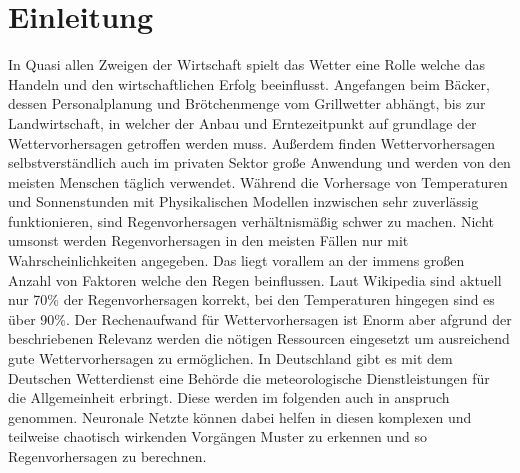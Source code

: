 \section{Einleitung}
In Quasi allen Zweigen der Wirtschaft spielt das Wetter eine Rolle welche das Handeln und den wirtschaftlichen Erfolg beeinflusst.
Angefangen beim Bäcker, dessen Personalplanung und Brötchenmenge vom Grillwetter abhängt, 
bis zur Landwirtschaft, in welcher der Anbau und Erntezeitpunkt auf grundlage der Wettervorhersagen getroffen werden muss. 
Außerdem finden Wettervorhersagen selbstverständlich auch im privaten Sektor große Anwendung und werden von den meisten Menschen täglich verwendet. 
Während die Vorhersage von Temperaturen und Sonnenstunden mit Physikalischen Modellen inzwischen sehr zuverlässig funktionieren, 
sind Regenvorhersagen verhältnismäßig schwer zu machen. Nicht umsonst werden Regenvorhersagen in den meisten Fällen nur mit Wahrscheinlichkeiten angegeben. 
Das liegt vorallem an der immens großen Anzahl von Faktoren welche den Regen beinflussen. 
Laut Wikipedia sind aktuell nur 70\% der Regenvorhersagen korrekt, bei den Temperaturen hingegen sind es über 90\%. 
Der Rechenaufwand für Wettervorhersagen ist Enorm aber afgrund der beschriebenen Relevanz werden die nötigen Ressourcen eingesetzt um ausreichend gute Wettervorhersagen zu ermöglichen.
In Deutschland gibt es mit dem Deutschen Wetterdienst eine Behörde die meteorologische Dienstleistungen für die Allgemeinheit erbringt.
Diese werden im folgenden auch in anspruch genommen.      
\noindent Neuronale Netzte können dabei helfen in diesen komplexen und teilweise chaotisch wirkenden Vorgängen Muster zu erkennen und so Regenvorhersagen zu berechnen. 
